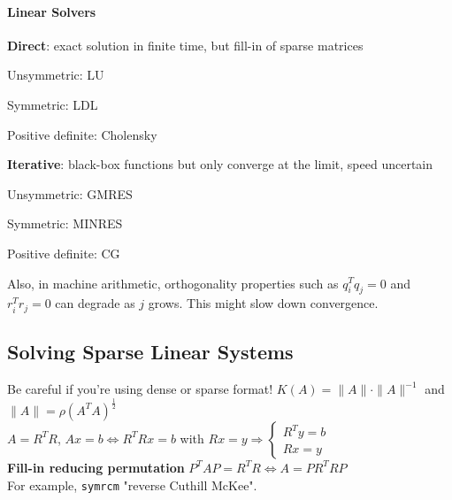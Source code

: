 \documentclass[10pt]{report}
\begin{document}
\paragraph{Linear Solvers}
\begin{list}{}{}
	\item \textbf{Direct}: exact solution in finite time, but fill-in of sparse matrices\begin{list}{}{}
		\item Unsymmetric: LU
		\item Symmetric: LDL
		\item Positive definite: Cholensky
	\end{list}
	\item \textbf{Iterative}: black-box functions but only converge at the limit, speed uncertain\begin{list}{}{}
		\item Unsymmetric: GMRES
		\item Symmetric: MINRES
		\item Positive definite: CG
	\end{list}
\end{list}
Also, in machine arithmetic, orthogonality properties such as $q_i^Tq_j=0$ and $r_i^Tr_j=0$ can degrade as $j$ grows. This might slow down convergence.
\subsection{Solving Sparse Linear Systems}
Be careful if you're using dense or sparse format! $K(A) = \|A\|\cdot\|A\|^{-1}$ and $\|A\|=\rho(A^TA)^{\frac{1}{2}}$\\
$A=R^TR$, $Ax=b\Leftrightarrow R^TRx=b$ with $Rx=y \Rightarrow\left\{\begin{array}{l}
R^Ty = b\\Rx=y
\end{array}\right.$\\
\textbf{Fill-in reducing permutation} $P^TAP = R^TR\Leftrightarrow A = PR^TRP$\\
For example, \texttt{symrcm} "reverse Cuthill McKee".
\end{document}
